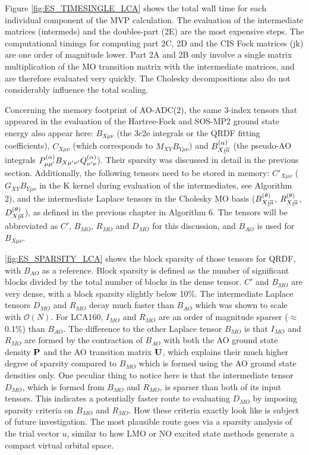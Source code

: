 Figure \ref{fig:ES_TIMESINGLE_LCA} shows the total wall time for each individual component of the MVP calculation. The evaluation of the intermediate matrices (intermeds) and the doubles-part (2E) are the most expensive steps. The computational timings for computing part 2C, 2D and the CIS Fock matrices (jk) are one order of magnitude lower. Part 2A and 2B only involve a single matrix multiplication of the MO transition matrix with the intermediate matrices, and are therefore evaluated very quickly. The Cholesky decompositions also do not considerably influence the total scaling. 

Concerning the memory footprint of AO-ADC(2), the same 3-index tensors that appeared in the evaluation of the Hartree-Fock and SOS-MP2 ground state energy also appear here: $B_{X\mu\nu}$ (the 3c2e integrals or the QRDF fitting coefficients), $C_{X\mu\nu}$ (which corresponds to $M_{XY}B_{Y\mu\nu}$) and $B^{(\alpha)}_{X\underline{i}\overline{a}}$ (the pseudo-AO integrals $P^{(\alpha)}_{\mu\mu'} B_{X\mu'\nu'} Q^{(\alpha)}_{\nu'\nu}$). Their sparsity was discussed in detail in the previous section. Additionally, the following tensors need to be stored in memory: $C'_{X\mu\nu}$ ($G_{XY}B_{Y\mu\nu}$ in the K kernel during evaluation of the intermediates, see Algorithm 2), and the intermediate Laplace tensors in the Cholesky MO basis ($B^{(\theta)}_{X\underline{i}\overline{a}}$, $R^{(\theta)}_{X\underline{i}\overline{a}}$, $D^{(\theta)}_{X\underline{i}\overline{a}}$), as defined in the previous chapter in Algorithm 6. The tensors will be abbreviated as $C'$, $B_{MO}$, $R_{MO}$ and $D_{MO}$ for this discussion, and $B_{AO}$ is used for $B_{X\mu\nu}$.

\ref{fig:ES_SPARSITY_LCA} shows the block sparsity of those tensors for QRDF, with $B_{AO}$ as a reference. Block sparsity is defined as the number of significant blocks divided by the total number of blocks in the dense tensor. $C'$ and $B_{MO}$ are very dense, with a block sparsity slightly below 10\%. The intermediate Laplace tensors $D_{MO}$ and $R_{MO}$ decay much faster than $B_{AO}$ which was shown to scale with $\mathcal{O}(N)$. For LCA160, $I_{MO}$ and $R_{MO}$ are an order of magnitude sparser ($\approx$ 0.1\%) than $B_{AO}$. The difference to the other Laplace tensor $B_{MO}$ is that $I_{MO}$ and $R_{MO}$ are formed by the contraction of $B_{AO}$ with both the AO ground state density $\mathbf{P}$ and the AO transition matrix $\mathbf{U}$, which explains their much higher degree of sparsity compared to $B_{MO}$ which is formed using the AO ground state densities only. One peculiar thing to notice here is that the intermediate tensor $D_{MO}$, which is formed from $B_{MO}$ and $R_{MO}$, is sparser than both of its input tensors. This indicates a potentially faster route to evaluating $D_{MO}$ by imposing sparsity criteria on $B_{MO}$ and $R_{MO}$. How these criteria exactly look like is subject of future investigation. The most plausible route goes via a sparsity analysis of the trial vector $u$, similar to how LMO or NO excited state methods generate a compact virtual orbital space.

